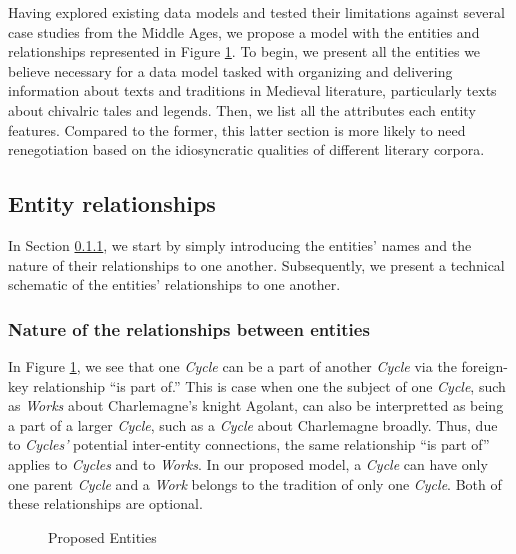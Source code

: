Having explored existing data models and tested their limitations against several case studies from the Middle Ages, we propose a model with the entities and relationships represented in Figure \ref{fig:ProposedEntities}. To begin, we present all the entities we believe necessary for a data model tasked with organizing and delivering information about texts and traditions in Medieval literature, particularly texts about chivalric tales and legends. Then, we list all the attributes each entity features. Compared to the former, this latter section is more likely to need renegotiation based on the idiosyncratic qualities of different literary corpora.

\subsection{Entity relationships}

In Section \ref{sec:basicER}, we start by simply introducing the entities' names and the nature of their relationships to one another. Subsequently, we present a technical schematic of the entities' relationships to one another.

\subsubsection{Nature of the relationships between entities}
\label{sec:basicER}

In Figure \ref{fig:ProposedEntities}, we see that one \textit{Cycle} can be a part of another \textit{Cycle} via the foreign-key relationship ``is part of.'' This is case when one the subject of one \textit{Cycle}, such as \textit{Works} about Charlemagne's knight Agolant, can also be interpretted as being a part of a larger \textit{Cycle}, such as a \textit{Cycle} about Charlemagne broadly. Thus, due to \textit{Cycles'} potential inter-entity connections, the same relationship ``is part of'' applies to \textit{Cycles} and to \textit{Works}. In our proposed model, a \textit{Cycle} can have only one parent \textit{Cycle} and a \textit{Work} belongs to the tradition of only one \textit{Cycle}. Both of these relationships are optional.

\begin{figure}[ht]
    \begin{center}
        
    \end{center}
\caption{Proposed Entities}
\label{fig:ProposedEntities}
\end{figure}

